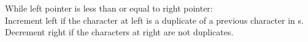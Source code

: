 \documentclass[preview]{standalone}
\begin{document}
While left pointer is less than or equal to right pointer:\\Increment left if the character at left is a duplicate of a previous character in s.\\Decrement right if the characters at right are not duplicates.\\
\end{document}
